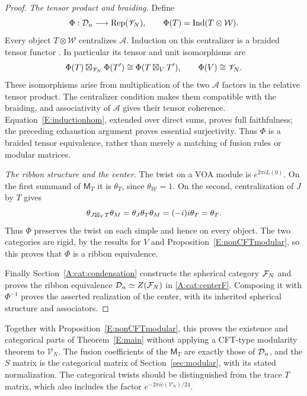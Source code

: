 \documentclass[11pt]{article}
\numberwithin{equation}{section}
\begin{document}
\begin{proof}
\emph{The tensor product and braiding.} Define
\begin{equation}\label{E:ribbonfunctor}
\Phi:\mathcal D_n\longrightarrow\operatorname{Rep}(\mathscr{V}_N),\qquad
\Phi(T)=\operatorname{Ind}(T\otimes\mathcal W).
\end{equation}
Every object $T\otimes\mathcal W$ centralizes $\mathscr A$. Induction on this centralizer is a braided tensor functor \cite[Theorems~2.67 and 3.68]{E:CKMext}. In particular its tensor and unit isomorphisms are
\begin{equation}\label{E:inductiontensor}
\Phi(T)\boxtimes_{\mathscr{V}_N}\Phi(T')\cong\Phi(T\boxtimes_V T'),
\qquad \Phi(V)\cong\mathscr{V}_N.
\end{equation}
These isomorphisms arise from multiplication of the two $\mathscr A$ factors in the relative tensor product. The centralizer condition makes them compatible with the braiding, and associativity of $\mathscr A$ gives their tensor coherence. Equation~\eqref{E:inductionhom}, extended over direct sums, proves full faithfulness; the preceding exhaustion argument proves essential surjectivity. Thus $\Phi$ is a braided tensor equivalence, rather than merely a matching of fusion rules or modular matrices.

\emph{The ribbon structure and the center.} The twist on a VOA module is $e^{2\pi i L(0)}$. On the first summand of $\mathsf M_T$ it is $\theta_T$, since $\theta_{\mathcal W}=1$. On the second, centralization of $J$ by $T$ gives
\begin{equation}\label{E:twistpreserved}
\theta_{J\boxtimes_V T}\theta_M
=\theta_J\theta_T\theta_M=(-i)i\theta_T=\theta_T.
\end{equation}
Thus $\Phi$ preserves the twist on each simple and hence on every object. The two categories are rigid, by the results for $V$ and Proposition~\ref{E:nonCFTmodular}, so this proves that $\Phi$ is a ribbon equivalence.

Finally Section~\ref{A:cat:condensation} constructs the spherical category $\mathcal F_N$ and proves the ribbon equivalence $\mathcal D_n\simeq Z(\mathcal F_N)$ in \eqref{A:cat:centerF}. Composing it with $\Phi^{-1}$ proves the asserted realization of the center, with its inherited spherical structure and associators.
\end{proof}

Together with Proposition~\ref{E:nonCFTmodular}, this proves the existence and categorical parts of Theorem~\ref{E:main} without applying a CFT-type modularity theorem to $\mathscr{V}_N$. The fusion coefficients of the $\mathsf M_T$ are exactly those of $\mathcal D_n$, and the $S$ matrix is the categorical matrix of Section~\ref{sec:modular}, with its stated normalization. The categorical twists should be distinguished from the trace $T$ matrix, which also includes the factor $e^{-2\pi i c(\mathscr{V}_N)/24}$.
\end{document}

